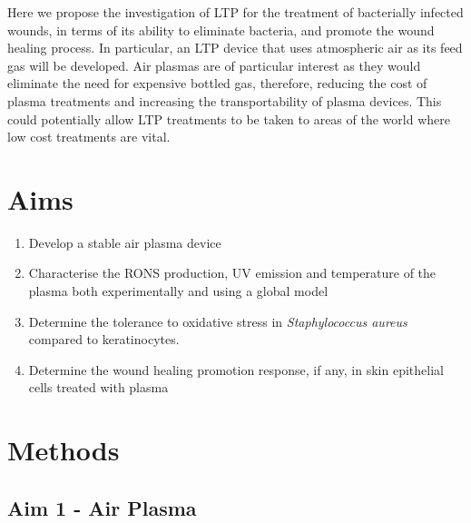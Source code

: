 \documentclass[11pt, oneside]{article}   	%
\begin{document}
Here we propose the investigation of LTP for the treatment of bacterially infected wounds, in terms of its ability to eliminate bacteria, and promote the wound healing process.
In particular, an LTP device that uses atmospheric air as its feed gas will be developed.
Air plasmas are of particular interest as they would eliminate the need for expensive bottled gas, therefore, reducing the cost of plasma treatments and increasing the transportability of plasma devices.
This could potentially allow LTP treatments to be taken to areas of the world where low cost treatments are vital.




\section*{Aims}
\begin{enumerate}
\item Develop a stable air plasma device
\item Characterise the RONS production, UV emission and temperature of the plasma both experimentally and using a global model
\item Determine the tolerance to oxidative stress in \textit{Staphylococcus aureus} compared to keratinocytes.
\item Determine the wound healing promotion response, if any, in skin epithelial cells treated with plasma
\end{enumerate}

\section*{Methods}
\subsection*{Aim 1 - Air Plasma}
\end{document}
